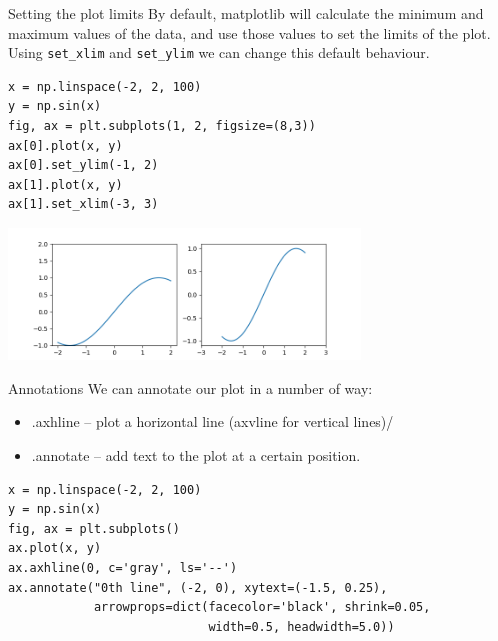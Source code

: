\documentclass[10pt]{beamer}
\begin{document}
\begin{frame}[label={sec:orgcbf50d3},fragile]{Setting the plot limits}
 By default, matplotlib will calculate the minimum and maximum values of the
data, and use those values to set the limits of the plot. Using \texttt{set\_xlim} and
\texttt{set\_ylim} we can change this default behaviour.

\begin{verbatim}
x = np.linspace(-2, 2, 100)
y = np.sin(x)
fig, ax = plt.subplots(1, 2, figsize=(8,3))
ax[0].plot(x, y)
ax[0].set_ylim(-1, 2)
ax[1].plot(x, y)
ax[1].set_xlim(-3, 3)
\end{verbatim}

\begin{center}
\includegraphics[width=0.7\textwidth]{images/limits.png}
\end{center}
\end{frame}

\begin{frame}[label={sec:org1bdb68c},fragile]{Annotations}
 We can annotate our plot in a number of way:
\begin{itemize}
\item .axhline -- plot a horizontal line (axvline for vertical lines)/
\item .annotate -- add text to the plot at a certain position.
\end{itemize}

\begin{verbatim}
x = np.linspace(-2, 2, 100)
y = np.sin(x)
fig, ax = plt.subplots()
ax.plot(x, y)
ax.axhline(0, c='gray', ls='--')
ax.annotate("0th line", (-2, 0), xytext=(-1.5, 0.25),
            arrowprops=dict(facecolor='black', shrink=0.05,
                            width=0.5, headwidth=5.0))
\end{verbatim}
\end{frame}
\end{document}
